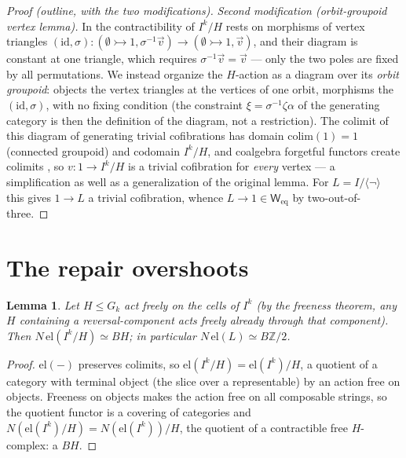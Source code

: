 \documentclass[11pt]{amsart}
\newtheorem{lem}[thm]{Lemma}
\theoremstyle{definition}
\newcommand{\G}{G}
\newcommand{\el}{\mathrm{el}}
\newcommand{\Ldash}{L}
\newcommand{\Weq}{\mathsf{W}_{\mathrm{eq}}}
\begin{document}
\begin{proof}[Proof (outline, with the two modifications)]
  \emph{Second modification (orbit-groupoid vertex lemma).}  In
  \cite[Lem.~5.2.5]{ACCRS} the contractibility of $I^k/H$ rests on
  morphisms of vertex triangles
  $(\mathrm{id}, \sigma) : (\emptyset \rightarrowtail 1,
  \sigma^{-1}\vec{v}) \to (\emptyset \rightarrowtail 1, \vec{v})$,
  and their diagram is constant at one triangle, which requires
  $\sigma^{-1}\vec{v} = \vec{v}$ --- only the two poles are fixed
  by all permutations.  We instead organize the $H$-action as a
  diagram over its \emph{orbit groupoid}: objects the vertex
  triangles at the vertices of one orbit, morphisms the
  $(\mathrm{id}, \sigma)$, with no fixing condition (the
  constraint $\xi = \sigma^{-1}\zeta\alpha$ of the generating
  category is then the definition of the diagram, not a
  restriction).  The colimit of this diagram of generating trivial
  cofibrations has domain
  $\mathrm{colim}(1) = 1$ (connected groupoid) and codomain
  $I^k/H$, and coalgebra forgetful functors create colimits
  \cite{BourkeGarner}, so $v : 1 \to I^k/H$ is a trivial
  cofibration for \emph{every} vertex --- a simplification as well
  as a generalization of the original lemma.  For
  $\Ldash = I/\langle\neg\rangle$ this gives
  $1 \to \Ldash$ a trivial cofibration, whence
  $\Ldash \to 1 \in \Weq$ by two-out-of-three.
\end{proof}

\section{The repair overshoots}
\label{sec:overshoot}

\begin{lem}
  \label{lem:elBH}
  Let $H \leq \G_k$ act freely on the cells of $I^k$ (by the
  freeness theorem, any $H$ containing a reversal-component acts
  freely already through that component).  Then
  $N\,\el(I^k/H) \simeq BH$; in particular
  $N\,\el(\Ldash) \simeq B\mathbb{Z}/2$.
\end{lem}

\begin{proof}
  $\el(-)$ preserves colimits, so
  $\el(I^k/H) = \el(I^k)/H$, a quotient of a category with
  terminal object (the slice over a representable) by an action
  free on objects.  Freeness on objects makes the action free on
  all composable strings, so the quotient functor is a covering of
  categories and
  $N(\el(I^k)/H) = N(\el(I^k))/H$, the quotient of a contractible
  free $H$-complex: a $BH$.
\end{proof}
\end{document}
